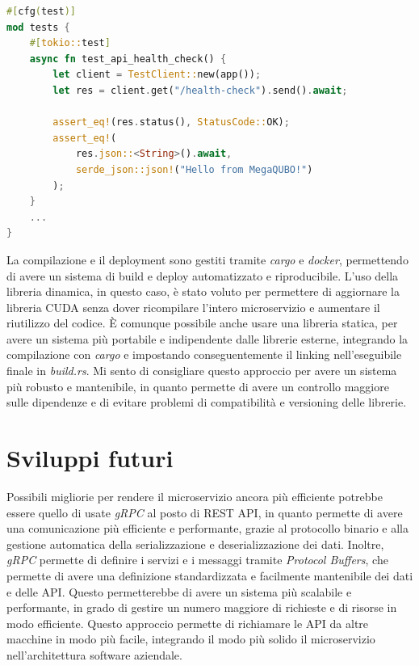 \vspace{5mm}
\begin{lstlisting}[language=rust, caption=Health check test, label=lis:health_check]
#[cfg(test)]
mod tests {
    #[tokio::test]
    async fn test_api_health_check() {
        let client = TestClient::new(app());
        let res = client.get("/health-check").send().await;

        assert_eq!(res.status(), StatusCode::OK);
        assert_eq!(
            res.json::<String>().await,
            serde_json::json!("Hello from MegaQUBO!")
        );
    }
    ...
}
\end{lstlisting}
\vspace{5mm}



La compilazione e il deployment sono gestiti tramite \textit{cargo} e \textit{docker}, permettendo di avere un sistema di build e deploy automatizzato e riproducibile. L'uso della libreria dinamica, in questo caso, è stato voluto per permettere di aggiornare la libreria CUDA senza dover ricompilare l'intero microservizio e aumentare il riutilizzo del codice. È comunque possibile anche usare una libreria statica, per avere un sistema più portabile e indipendente dalle librerie esterne, integrando la compilazione con \textit{cargo} e impostando conseguentemente il linking nell'eseguibile finale in \textit{build.rs}. Mi sento di consigliare questo approccio per avere un sistema più robusto e mantenibile, in quanto permette di avere un controllo maggiore sulle dipendenze e di evitare problemi di compatibilità e versioning delle librerie.

\section{Sviluppi futuri}



Possibili migliorie per rendere il microservizio ancora più efficiente potrebbe essere quello di usate \textit{gRPC} al posto di REST API, in quanto permette di avere una comunicazione più efficiente e performante, grazie al protocollo binario e alla gestione automatica della serializzazione e deserializzazione dei dati. Inoltre, \textit{gRPC} permette di definire i servizi e i messaggi tramite \textit{Protocol Buffers}, che permette di avere una definizione standardizzata e facilmente mantenibile dei dati e delle API. Questo permetterebbe di avere un sistema più scalabile e performante, in grado di gestire un numero maggiore di richieste e di risorse in modo efficiente. Questo approccio permette di richiamare le API da altre macchine in modo più facile, integrando il modo più solido il microservizio nell'architettura software aziendale.

